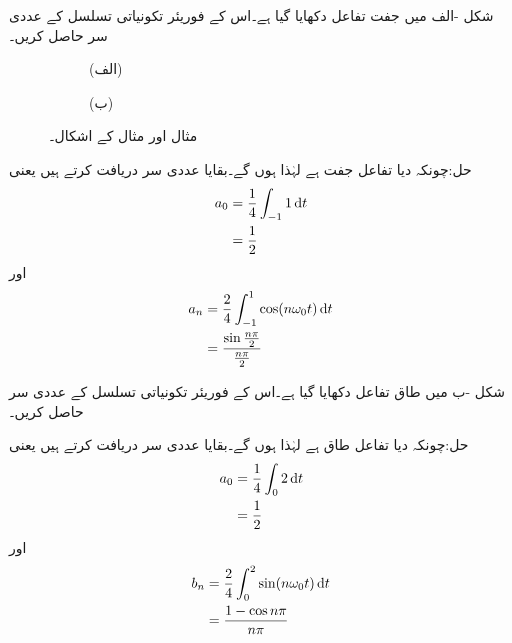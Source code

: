 شکل -الف میں جفت تفاعل دکھایا گیا ہے۔اس کے فوریئر تکونیاتی تسلسل کے عددی سر حاصل کریں۔
\begin{figure}
\centering
\begin{subfigure}{0.5\textwidth}
\centering
{}
\caption*{(الف)}
\end{subfigure}%
\begin{subfigure}{0.5\textwidth}
\centering
{}
\caption*{(ب)}
\end{subfigure}%
\caption{مثال  اور مثال  کے اشکال۔}
\label{شکل_فوریئر_جفت_طاق_مستطیل}
\end{figure}

حل:چونکہ دیا تفاعل جفت ہے لہٰذا  ہوں گے۔بقایا عددی سر دریافت کرتے ہیں یعنی
\begin{align*}
a_0&=\frac{1}{4}\int_{-1}{1} \dif t\\
&=\frac{1}{2}
\end{align*}
اور
\begin{align*}
a_n&=\frac{2}{4}\int_{-1}^{1} \cos (n\omega_0 t) \dif t\\
&=\frac{\sin \frac{n\pi}{2}}{\frac{n\pi}{2}}
\end{align*}

شکل -ب میں طاق تفاعل دکھایا گیا ہے۔اس کے فوریئر تکونیاتی تسلسل کے عددی سر حاصل کریں۔

حل:چونکہ دیا تفاعل طاق ہے لہٰذا  ہوں گے۔بقایا عددی سر دریافت کرتے ہیں یعنی
\begin{align*}
a_0&=\frac{1}{4}\int_{0}{2} \dif t\\
&=\frac{1}{2}
\end{align*}
اور
\begin{align*}
b_n&=\frac{2}{4}\int_{0}^{2} \sin (n\omega_0 t) \dif t\\
&=\frac{1-\cos n\pi}{n\pi}
\end{align*}

